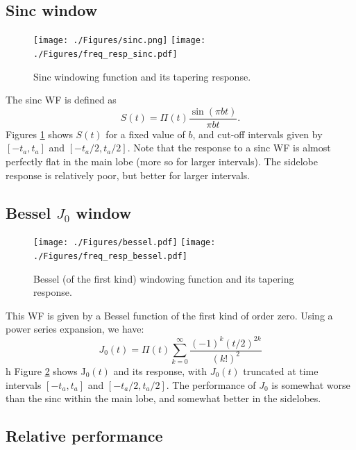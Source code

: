 \documentclass[useAMS,usenatbib]{mn2e}
\begin{document}
\subsection{Sinc window}
\begin{figure}
\texttt{[image: ./Figures/sinc.png]}%
\texttt{[image: ./Figures/freq\_resp\_sinc.pdf]}
\caption{Sinc windowing function and its tapering response.}\label{fig:wf:sinc}
\end{figure}
The sinc WF is defined as 
\begin{equation}
S(t)= \Pi(t) \frac{\sin(\pi b t)}{\pi b t} .
\end{equation}
Figures \ref{fig:wf:sinc} shows $S(t)$ for a fixed value of $b$, and cut-off intervals given by $[-t_a,t_a]$ and $[-t_a/2,t_a/2]$.
Note that the response to a sinc WF is almost perfectly flat in the main lobe (more so for larger intervals). The sidelobe response is relatively poor, but better for larger intervals.

\subsection{Bessel $J_0$ window}
\begin{figure}
\texttt{[image: ./Figures/bessel.pdf]}%
\texttt{[image: ./Figures/freq\_resp\_bessel.pdf]}
\caption{Bessel (of the first kind) windowing function and its tapering response.}\label{fig:wf:bessel}
\end{figure}


This WF is given by a Bessel function of the first kind of order zero. Using a power series expansion, we have:
\begin{equation}
J_0(t) = \Pi(t) \sum_{k=0}^{\infty}\frac{(-1)^k (t/2)^{2k}}{(k!)^2}
\end{equation}h
Figure \ref{fig:wf:bessel} shows J$_0(t)$ and its response, with $J_0(t)$ truncated at time intervals $[-t_a,t_a]$ and 
$[-t_a/2,t_a/2]$. The performance of $J_0$ is somewhat worse than the sinc within the main lobe, and somewhat better in
the sidelobes.

\subsection{Relative performance}
\end{document}

